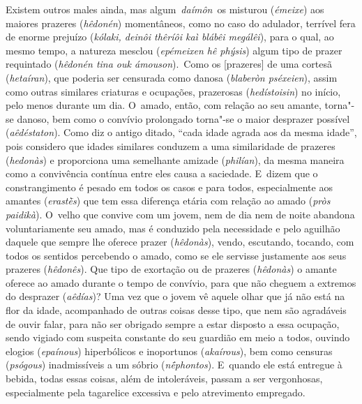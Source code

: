 Existem outros males ainda, mas algum~\emph{daímôn}~os misturou
(\emph{émeixe}) aos maiores prazeres (\emph{hêdonén}) momentâneos,
\bekker{[240b]} como no caso do adulador, terrível fera de enorme prejuízo
(\emph{kólaki, deinôi thêríôi kaì blábêi megálêi}), para o qual, ao
mesmo tempo, a natureza mesclou (\emph{epémeixen hê phýsis}) algum tipo
de prazer requintado (\emph{hêdonén tina ouk ámouson}).~Como os
[prazeres] de uma cortesã (\emph{hetaíran}), que poderia ser
censurada como danosa (\emph{blaberòn pséxeien}), assim como outras
similares criaturas e ocupações, prazerosas (\emph{hedístoisin}) no
início, pelo menos durante um dia. O~amado, então, com relação ao seu
amante, torna"-se danoso, bem como o convívio prolongado torna"-se o maior
desprazer possível (\emph{aêdéstaton}). \bekker{[240c]} Como diz o antigo
ditado, ``cada idade agrada aos da mesma idade'', pois considero que
idades similares conduzem a uma similaridade de prazeres
(\emph{hedonàs}) e proporciona uma semelhante amizade (\emph{philían}),
da mesma maneira como a convivência contínua entre eles causa a
saciedade. E~dizem que o constrangimento é pesado em todos os casos e
para todos, especialmente aos amantes (\emph{erastḕs}) que tem essa
diferença etária com relação ao amado (\emph{pròs paidikà}). O~velho que
convive com um jovem, nem de dia nem de noite abandona voluntariamente
seu amado, \bekker{[240d]} mas é conduzido pela necessidade e pelo aguilhão
daquele que sempre lhe oferece prazer (\emph{hêdonàs}), vendo,
escutando, tocando, com todos os sentidos percebendo o amado, como se
ele servisse justamente aos seus prazeres (\emph{hêdonês}). Que tipo de
exortação ou de prazeres (\emph{hêdonàs}) o amante oferece ao amado
durante o tempo de convívio, para que não cheguem a extremos do
desprazer (\emph{aêdías})? Uma vez que o jovem vê aquele olhar que já
não está na flor da idade, acompanhado de outras coisas desse tipo, que
nem são agradáveis de ouvir falar, \bekker{[240e]} para não ser obrigado
sempre a estar disposto a essa ocupação, sendo vigiado com suspeita
constante do seu guardião em meio a todos, ouvindo elogios
(\emph{epaínous}) hiperbólicos e inoportunos (\emph{akaírous}), bem como
censuras (\emph{psógous}) inadmissíveis a um sóbrio (\emph{nḗphontos}).
E~quando ele está entregue à bebida, todas essas coisas, além de
intoleráveis, passam a ser vergonhosas, especialmente pela tagarelice
excessiva e pelo atrevimento empregado.

